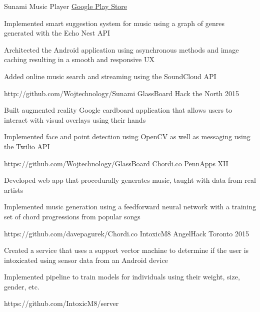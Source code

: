 \begin{cvprojects}
  \cvproject
    {Sunami Music Player}
    {\href{http://play.google.com/store/apps/details?id=com.wojtechnology.sunami}{Google Play Store}}
    {
      \begin{cvitems}
        \item Implemented smart suggestion system for music using a graph of genres generated with the Echo Nest API
        \item Architected the Android application using asynchronous methods and image caching resulting in a smooth and responsive UX
        \item Added online music search and streaming using the SoundCloud API
      \end{cvitems}
    }
    {http://github.com/Wojtechnology/Sunami}
  \cvproject
    {GlassBoard}
    {Hack the North 2015}
    {
      \begin{cvitems}
        \item Built augmented reality Google cardboard application that allows users to interact with visual overlays using their hands
        \item Implemented face and point detection using OpenCV as well as messaging using the Twilio API
      \end{cvitems}
    }
    {https://github.com/Wojtechnology/GlassBoard}
  \cvproject
    {Chordi.co}
    {PennApps XII}
    {
      \begin{cvitems}
        \item Developed web app that procedurally generates music, taught with data from real artists
        \item Implemented music generation using a feedforward neural network with a training set of chord progressions from popular songs
      \end{cvitems}
    }
    {https://github.com/davepagurek/Chordi.co}
  \cvproject
    {IntoxicM8}
    {AngelHack Toronto 2015}
    {
      \begin{cvitems}
        \item Created a service that uses a support vector machine to determine if the user is intoxicated using sensor data from an Android device
        \item Implemented pipeline to train models for individuals using their weight, size, gender, etc.
      \end{cvitems}
    }
    {https://github.com/IntoxicM8/server}
\end{cvprojects}
